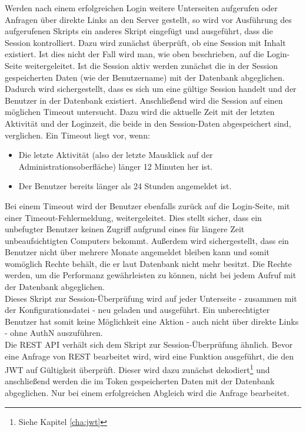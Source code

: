 Werden nach einem erfolgreichen Login weitere Unterseiten aufgerufen oder Anfragen über direkte Links an den Server gestellt, so wird vor Ausführung des aufgerufenen Skripts ein anderes Skript eingefügt und ausgeführt, dass die Session kontrolliert. Dazu wird zunächst überprüft, ob eine Session mit Inhalt existiert. Ist dies nicht der Fall wird man, wie oben beschrieben, auf die Login-Seite weitergeleitet. Ist die Session aktiv werden zunächst die in der Session gespeicherten Daten (wie \zB der Benutzername) mit der Datenbank abgeglichen. Dadurch wird sichergestellt, dass es sich um eine gültige Session handelt und der Benutzer in der Datenbank existiert. Anschließend wird die Session auf einen möglichen Timeout untersucht. Dazu wird die aktuelle Zeit mit der letzten Aktivität und der Loginzeit, die beide in den Session-Daten abgespeichert sind, verglichen. Ein Timeout liegt vor, wenn:
\begin{itemize}
	\item Die letzte Aktivität (also der letzte Mausklick auf der Administrationsoberfläche) länger 12 Minuten her ist.
	\item Der Benutzer bereits länger als 24 Stunden angemeldet ist.
\end{itemize}
Bei einem Timeout wird der Benutzer ebenfalls zurück auf die Login-Seite, mit einer Timeout-Fehlermeldung, weitergeleitet. Dies stellt sicher, dass ein unbefugter Benutzer keinen Zugriff aufgrund eines für längere Zeit unbeaufsichtigten Computers bekommt. Außerdem wird sichergestellt, dass ein Benutzer nicht über mehrere Monate angemeldet bleiben kann und somit womöglich Rechte behält, die er laut Datenbank nicht mehr besitzt. Die Rechte werden, um die Performanz gewährleisten zu können, nicht bei jedem Aufruf mit der Datenbank abgeglichen.\\
Dieses Skript zur Session-Überprüfung wird auf jeder Unterseite - zusammen mit der Konfigurationsdatei - neu geladen und ausgeführt. Ein unberechtigter Benutzer hat somit keine Möglichkeit eine Aktion - auch nicht über direkte Links - ohne \acl{AuthN} auszuführen.\\

Die \ac{REST} \ac{API} verhält sich dem Skript zur Session-Überprüfung ähnlich. Bevor eine Anfrage von \ac{REST} bearbeitet wird, wird eine Funktion ausgeführt, die den \ac{JWT} auf Gültigkeit überprüft. Dieser wird dazu zunächst dekodiert\footnote{Siehe Kapitel \ref{cha:jwt} } und anschließend werden die im Token gespeicherten Daten mit der Datenbank abgeglichen. Nur bei einem erfolgreichen Abgleich wird die Anfrage bearbeitet.

